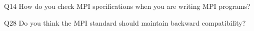 \begin{description}%
\item{Q14} How do you check MPI specifications when you are writing MPI programs?%
\item{Q28} Do you think the MPI standard should maintain backward compatibility?%
\end{description}%
